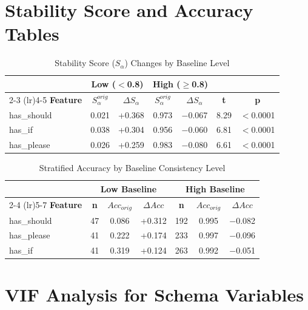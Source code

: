 \documentclass[sigconf,anonymous,review]{acmart}
\begin{document}
\section{Stability Score and Accuracy Tables}
\label{app:stability}

\begin{table}[h]
\centering
\caption{Stability Score ($S_\alpha$) Changes by Baseline Level}
\small
\begin{tabular}{@{}lcccccc@{}}
\toprule
& \multicolumn{2}{c}{\textbf{Low ($<$0.8)}} & \multicolumn{2}{c}{\textbf{High ($\geq$0.8)}} & & \\
\cmidrule(lr){2-3} \cmidrule(lr){4-5}
\textbf{Feature} & \textbf{$S_\alpha^{orig}$} & \textbf{$\Delta S_\alpha$} & \textbf{$S_\alpha^{orig}$} & \textbf{$\Delta S_\alpha$} & \textbf{t} & \textbf{p} \\
\midrule
has\_should & 0.021 & +0.368 & 0.973 & $-$0.067 & 8.29 & $<$0.0001 \\
has\_if & 0.038 & +0.304 & 0.956 & $-$0.060 & 6.81 & $<$0.0001 \\
has\_please & 0.026 & +0.259 & 0.983 & $-$0.080 & 6.61 & $<$0.0001 \\
\bottomrule
\end{tabular}
\end{table}

\begin{table}[h]
\centering
\caption{Stratified Accuracy by Baseline Consistency Level}
\small
\begin{tabular}{@{}lcccccc@{}}
\toprule
& \multicolumn{3}{c}{\textbf{Low Baseline}} & \multicolumn{3}{c}{\textbf{High Baseline}} \\
\cmidrule(lr){2-4} \cmidrule(lr){5-7}
\textbf{Feature} & \textbf{n} & \textbf{$Acc_{orig}$} & \textbf{$\Delta Acc$} & \textbf{n} & \textbf{$Acc_{orig}$} & \textbf{$\Delta Acc$} \\
\midrule
has\_should & 47 & 0.086 & +0.312 & 192 & 0.995 & $-$0.082 \\
has\_please & 41 & 0.222 & +0.174 & 233 & 0.997 & $-$0.096 \\
has\_if & 41 & 0.319 & +0.124 & 263 & 0.992 & $-$0.051 \\
\bottomrule
\end{tabular}
\end{table}

\section{VIF Analysis for Schema Variables}
\label{app:vif}
\end{document}
